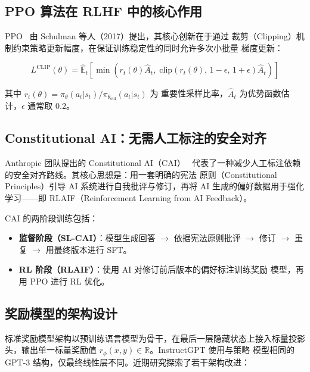 \documentclass[12pt,a4paper,UTF8]{ctexart}
\newcommand{\E}{\mathbb{E}}
\newcommand{\pitheta}{\pi_{\theta}}
\begin{document}
\subsection{PPO 算法在 RLHF 中的核心作用}

PPO~\cite{schulman2017ppo} 由 Schulman 等人（2017）提出，其核心创新在于通过
裁剪（Clipping）机制约束策略更新幅度，在保证训练稳定性的同时允许多次小批量
梯度更新：

\begin{equation}
  L^{\mathrm{CLIP}}(\theta)
    = \hat{\E}_t\!\left[
        \min\!\left(r_t(\theta)\hat{A}_t,\;
        \mathrm{clip}(r_t(\theta),\,1{-}\epsilon,\,1{+}\epsilon)\hat{A}_t\right)
      \right]
  \label{eq:ppo_clip}
\end{equation}

其中 $r_t(\theta)=\pitheta(a_t|s_t)/\pi_{\theta_{\mathrm{old}}}(a_t|s_t)$ 为
重要性采样比率，$\hat{A}_t$ 为优势函数估计，$\epsilon$ 通常取 0.2。

\subsection{Constitutional AI：无需人工标注的安全对齐}

Anthropic 团队提出的 Constitutional AI（CAI）~\cite{bai2022constitutional}
代表了一种减少人工标注依赖的安全对齐路线。其核心思想是：用一套明确的宪法
原则（Constitutional Principles）引导 AI 系统进行自我批评与修订，再将
AI 生成的偏好数据用于强化学习——即 RLAIF（Reinforcement Learning from AI
Feedback）。

CAI 的两阶段训练包括：
\begin{itemize}[leftmargin=2em]
  \item \textbf{监督阶段（SL-CAI）}：模型生成回答 $\to$ 依据宪法原则批评
    $\to$ 修订 $\to$ 重复 $\to$ 用最终版本进行 SFT。
  \item \textbf{RL 阶段（RLAIF）}：使用 AI 对修订前后版本的偏好标注训练奖励
    模型，再用 PPO 进行 RL 优化。
\end{itemize}

\subsection{奖励模型的架构设计}

标准奖励模型架构以预训练语言模型为骨干，在最后一层隐藏状态上接入标量投影
头，输出单一标量奖励值 $r_\phi(x,y)\in\mathbb{R}$。InstructGPT 使用与策略
模型相同的 GPT-3 结构，仅最终线性层不同。近期研究探索了若干架构改进：
\end{document}

